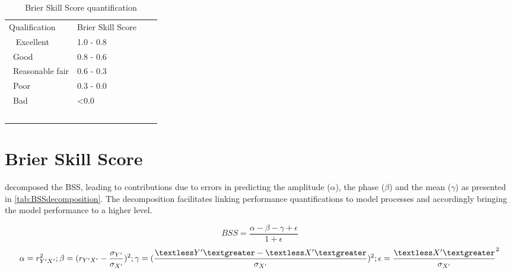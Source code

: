 \begin{table}[H]
  \centering
  \begin{table}[!tbp]
    \caption{Brier Skill Score quantification \citep{VanRijn2003}}
    \label{tab:BSSquantification}
    \begin{center}
      \begin{tabular}{llll}
        \hline\hline
        Qualification & Brier Skill Score\\\
        \hline
        Excellent & 1.0 - 0.8\\\
        Good & 0.8 - 0.6\\\
        Reasonable fair & 0.6 - 0.3\\\
        Poor & 0.3 - 0.0\\\
        Bad & \textless 0.0\\\
        \hline
      \end{tabular}
    \end{center}
  \end{table}
\end{table}

\section{Brier Skill Score \citep{Murphy1989}}

\citet{Murphy1989} decomposed the BSS, leading to contributions due to errors in predicting the amplitude ($\alpha$), the phase ($\beta$) and the mean ($\gamma$) as presented in \autoref{tab:BSSdecomposition}. The decomposition facilitates linking performance quantifications to model processes and accordingly bringing the model performance to a higher level.

\begin{equation}BSS=\frac{\alpha-\beta-\gamma+\epsilon}{1+\epsilon}\end{equation}
\begin{equation}\alpha=r^{2}_{Y'X'}; \beta=(r_{Y'X'}-\frac{\sigma_{Y'}}{\sigma_{X'}})^{2};  \gamma=(\frac{\textless Y'\textgreater-\textless X'\textgreater}{\sigma_{X'}})^{2}; \epsilon=\frac{\textless X'\textgreater}{\sigma_{X'}}^{2} \end{equation}

